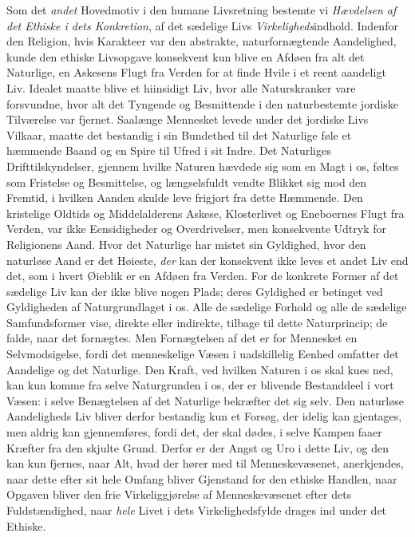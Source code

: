 \documentclass[12pt,a4paper,openany]{book}
\newcommand{\opage}[1]{\marginnote{\footnotesize\textit{[#1]}}}
\begin{document}
Som det \emph{andet} Hovedmotiv i den humane Livsretning
bestemte vi \emph{Hævdelsen af det Ethiske i dets Konkretion},
af det sædelige Livs \emph{Virkeligheds}indhold. Indenfor
den Religion, hvis Karakteer var den abstrakte, naturfornægtende
Aandelighed, kunde den ethiske Livsopgave konsekvent
kun blive en Afdøen fra alt det Naturlige, en Askesens Flugt
fra Verden for at finde Hvile i et reent aandeligt Liv. Idealet
maatte blive et hiinsidigt Liv, hvor alle Naturskranker vare
forsvundne, hvor alt det Tyngende og Besmittende i den
\opage{496}naturbestemte jordiske Tilværelse var fjernet. Saalænge
Mennesket levede under det jordiske Livs Vilkaar, maatte det
bestandig i sin Bundethed til det Naturlige føle et hæmmende
Baand og en Spire til Ufred i sit Indre. Det Naturliges
Drifttilskyndelser, gjennem hvilke Naturen hævdede sig som
en Magt i os, føltes som Fristelse og Besmittelse, og
længselsfuldt vendte Blikket sig mod den Fremtid, i hvilken
Aanden skulde leve frigjort fra dette Hæmmende. Den kristelige
Oldtids og Middelalderens Askese, Klosterlivet og Eneboernes
Flugt fra Verden, var ikke Eensidigheder og Overdrivelser,
men konsekvente Udtryk for Religionens Aand. Hvor det
Naturlige har mistet sin Gyldighed, hvor den naturløse Aand
er det Høieste, \emph{der} kan der konsekvent ikke leves et andet Liv
end det, som i hvert Øieblik er en Afdøen fra Verden. For
de konkrete Former af det sædelige Liv kan der ikke blive
nogen Plads; deres Gyldighed er betinget ved Gyldigheden
af Naturgrundlaget i os. Alle de sædelige Forhold og alle
de sædelige Samfundsformer vise, direkte eller indirekte, tilbage
til dette Naturprincip; de falde, naar det fornægtes.
Men Fornægtelsen af det er for Mennesket en Selvmodsigelse,
fordi det menneskelige Væsen i uadskillelig Eenhed
omfatter det Aandelige og det Naturlige. Den Kraft, ved
hvilken Naturen i os skal kues ned, kan kun komme fra
selve Naturgrunden i os, der er blivende Bestanddeel i vort
Væsen: i selve Benægtelsen af det Naturlige bekræfter det
sig selv. Den naturløse Aandeligheds Liv bliver derfor bestandig
kun et Forsøg, der idelig kan gjentages, men aldrig kan
gjennemføres, fordi det, der skal dødes, i selve Kampen faaer
Kræfter fra den skjulte Grund. Derfor er der Angst og
Uro i dette Liv, og den kan kun fjernes, naar Alt, hvad
der hører med til Menneskevæsenet, anerkjendes, naar dette
efter sit hele Omfang bliver Gjenstand for den ethiske Handlen,
naar Opgaven bliver den frie Virkeliggjørelse af Menneskevæsenet
efter dets Fuldstændighed, naar \emph{hele} Livet i dets
Virkelighedsfylde drages ind under det Ethiske.
\end{document}
